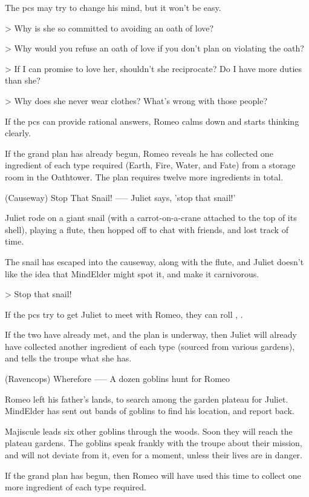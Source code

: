 The \glspl{pc} may try to change his mind, but it won't be easy.

> Why is she so committed to avoiding an oath of love?

> Why would you refuse an oath of love if you don't plan on violating the oath?

> If I can promise to love her, shouldn't she reciprocate?  Do I have more duties than she?

> Why does she never wear clothes?  What's wrong with those people?

If the \glspl{pc} can provide rational answers, Romeo calms down and starts thinking clearly.

If the grand plan has already begun,
Romeo reveals he has collected one \gls{ingredient} of each type required (Earth, Fire, Water, and Fate) from a storage room in the Oathtower.
The plan requires twelve more \glspl{ingredient} in total.

(Causeway) Stop That Snail!
-----
{Juliet says, 'stop that snail!'}

Juliet rode on a giant snail (with a carrot-on-a-crane attached to the top of its shell), playing a flute, then hopped off to chat with friends, and lost track of time.

The snail has escaped into the causeway, along with the flute, and Juliet doesn't like the idea that \gls{MindElder} might spot it, and make it carnivorous.

> Stop that snail!

If the \glspl{pc} try to get Juliet to meet with Romeo,
they can roll , \tn[5].

If the two have already met, and the plan is underway,
then Juliet will already have collected another \gls{ingredient} of each type (sourced from various gardens), and tells the troupe what she has.

(Ravencops) Wherefore
-----
{A dozen goblins hunt for Romeo}

Romeo left his father's lands, to search among the garden plateau for Juliet.
\Gls{MindElder} has sent out bands of goblins to find his location, and report back.

Majiscule leads six other goblins through the woods.
Soon they will reach the plateau gardens.
The goblins speak frankly with the troupe about their mission, and will not deviate from it, even for a moment, unless their lives are in danger.

If the grand plan has begun,
then Romeo will have used this time to collect one more \gls{ingredient} of each type required.


